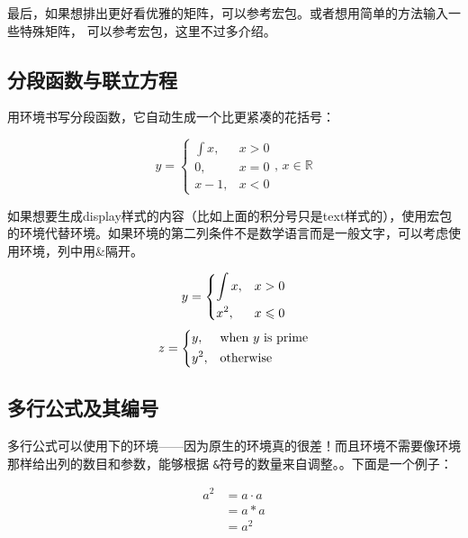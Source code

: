 最后，如果想排出更好看优雅的矩阵，可以参考宏包。或者想用简单的方法输入一些特殊矩阵， 可以参考宏包，这里不过多介绍。

\subsection{分段函数与联立方程}
用环境书写分段函数，它自动生成一个比更紧凑的花括号：

\begin{codeshow}
\[y=\begin{cases}
\int x, & x>0 \\
0,   & x=0 \\
x-1, & x<0
\end{cases},\,x\in\mathbb{R}\]
\end{codeshow}

如果想要生成display样式的内容（比如上面的积分号只是text样式的），使用宏包的环境代替环境。如果环境的第二列条件不是数学语言而是一般文字，可以考虑使用环境，列中用\&{}隔开。

\begin{codeshow}
\[y=\begin{dcases}
  \int x, & x>0 \\
  x^2, & x\leqslant 0
  \end{dcases}\]
\[z=\begin{dcases*}
  y, & when $y$ is prime\\
  y^2, & otherwise
  \end{dcases*}\]
\end{codeshow}

\subsection{多行公式及其编号}
\label{subsec:multieqnum}
多行公式可以使用下的环境——因为原生的环境真的很差！而且环境不需要像环境那样给出列的数目和参数，能够根据
\texttt{\&}符号的数量来自调整。。下面是一个例子：

\begin{codeshow}
\begin{align}
  a^2  &= a\cdot a \\
       &= a*a      \\
       &= a^2
\end{align}
\end{codeshow}

